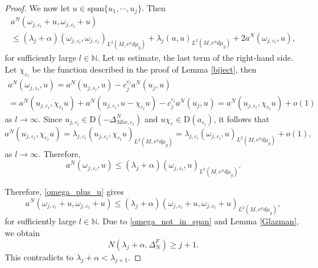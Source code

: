 \documentclass[12pt,a4paper]{amsart}
\numberwithin{equation}{section}
\theoremstyle{plain}
\theoremstyle{definition}
\begin{document}
\begin{proof}
    We now let $u\in \text{span}\{u_1,\cdots,u_j\}$. Then 
	\begin{multline}\label{omega_plus_u}
		a^N(\omega_{j,\varepsilon_l} + u , \omega_{j,\varepsilon_l} + u)\\
             \leq(\lambda_{j} + \alpha) (\omega_{j,\varepsilon_l} ,\omega_{j,\varepsilon_l} )_{L^2(M,e^\phi d\mu_g)} + \lambda_{j} (u ,u )_{L^2(M,e^\phi d\mu_g)} + 2a^N(\omega_{j,\varepsilon_l} ,u),
	\end{multline}
    for sufficiently large $l\in \mathbb N$. Let us estimate, the last term of the right-hand side. Let $\chi_{\varepsilon_l}$ be the function described in the proof of Lemma \ref{biject}, then
    \begin{multline*}
        a^N(\omega_{j,\varepsilon_l} ,u) = a^N(u_{j,\varepsilon_l},u) - c_j^{\varepsilon_l}a^N(u_j,u)\\
        = a^N(u_{j,\varepsilon_l},\chi_{\varepsilon_l}u) + a^N(u_{j,\varepsilon_l},u -  \chi_{\varepsilon_l}u) - c_j^{\varepsilon_l}a^N(u_j,u) = a^N(u_{j,\varepsilon_l},\chi_{\varepsilon_l}u) +o(1)
    \end{multline*}
    as $l\rightarrow \infty$. Since $u_{j,\varepsilon_l} \in \mathrm{D}(-\Delta_{Mix,\varepsilon_l}^N)$ and $u\chi_{\varepsilon} \in \mathrm{D}(a_{\varepsilon_l})$, it follows that
    \begin{equation*}
        a^N(u_{j,\varepsilon_l},\chi_{\varepsilon_l}u) = \lambda_{j,\varepsilon_l}(u_{j,\varepsilon_l},\chi_{\varepsilon_l}u)_{L^2(M,e^\phi d\mu_g)} = \lambda_{j,\varepsilon_l}(\omega_{j,\varepsilon_l},u)_{L^2(M,e^\phi d\mu_g)} + o(1),
    \end{equation*}
    as $l\rightarrow \infty$. Therefore,
    \begin{equation*}
        a^N(\omega_{j,\varepsilon_l} ,u) \leq (\lambda_j + \alpha) (\omega_{j,\varepsilon_l},u)_{L^2(M,e^\phi d\mu_g)}.
    \end{equation*}
    
    Therefore, \eqref{omega_plus_u} gives
	\begin{equation*}
		a^N(\omega_{j,\varepsilon_l} + u , \omega_{j,\varepsilon_l} + u) \leq (\lambda_j + \alpha) (\omega_{j,\varepsilon_l} + u , \omega_{j,\varepsilon_l} + u)_{L^2(M,e^\phi d\mu_g)}, 
	\end{equation*}
    for sufficiently large $l\in \mathbb{N}$. Due to \eqref{omega_not_in_span} and Lemma \ref{Glazman}, we obtain
    $$N(\lambda_j + \alpha, \Delta_N^F) \geq j + 1.$$
    This contradicts to $\lambda_j + \alpha < \lambda_{j + 1}$.
\end{proof}
\end{document}
